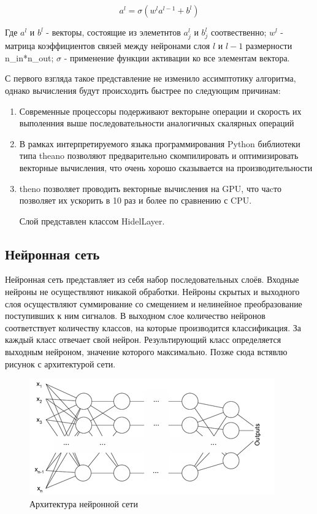 \documentclass[a4paper,12pt]{article}
\begin{document}
{\large $$a^{l} = \sigma\left( w^{l} a^{l-1} + b^l \right)$$}

Где $a^{l}$ и $b^{l}$ - векторы, состоящие из элеметнтов $a^{l}_j$ и $b^l_j$ соотвественно; $w^l$ - матрица коэффициентов связей между нейронами слоя $l$ и $l-1$ размерности n\_in*n\_out; $\sigma$ - применение функции активации ко все элементам вектора.

С первого взгляда такое представление не изменило ассимптотику алгоритма, однако вычисления будут происходить быстрее по следующим причинам:
\begin{enumerate}
\item Современные процессоры подерживают векторыне операции и скорость их выполенния выше последовательности аналогичных скалярных операций
\item В рамках интерпретируемого языка программирования Python библиотеки типа theano позволяют предварительно скомпилировать и оптимизировать векторные вычисления, что очень хорошо сказывается на производительности
\item theno позволяет проводить векторные вычисления на GPU, что чаcто позволяет их ускорить в 10 раз и более по сравнению с CPU.

Слой представлен классом HidelLayer.
\end{enumerate}

\subsection{Нейронная сеть}
Нейронная сеть представляет из себя набор последовательных слоёв. Входные нейроны не осуществляют никакой обработки. Нейроны скрытых и выходного слоя осуществляют суммирование со смещением и нелинейное преобразование поступивших к ним сигналов. В выходном слое количество нейронов соответствует количеству классов, на которые производится классификация. За каждый класс отвечает свой нейрон. Результирующий класс определяется выходным нейроном, значение которого максимально.
Позже сюда встявлю рисунок с архитектурой сети.

\begin{center}
	\begin{figure}[h!]
		\centering
   		\includegraphics[scale=0.8]{img/mlp.png}
   		\caption{Архитектура нейронной сети}
   		\label{fig:mlp}
    \end{figure}
\end{center}
\end{document}
